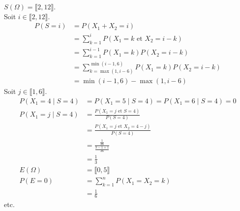 \documentclass[../main.tex]{subfiles}
\begin{document}
\noindent $S(\Omega) = \llbracket 2, 12 \rrbracket$. \\
Soit $i\in \llbracket 2, 12 \rrbracket$. 
\begin{align*}
    P(S = i) &= P(X_1 + X_2 = i) \\
    &= \sum_{k=1}^{i} P(X_1 = k \text{ et } X_2 = i - k) \\
    &= \sum_{k=1}^{i-1} P(X_1 = k) P(X_2 = i - k) \\
    &= \sum_{k=\max(1, i-6)}^{\min(i-1, 6)} P(X_1 = k) P(X_2 = i - k) \\
    &= \min(i-1, 6) - \max(1, i-6)
\end{align*}
Soit $j\in \llbracket 1, 6 \rrbracket$. 
\begin{align*}
    P(X_1 = 4 \mid S = 4) &= P(X_1 = 5 \mid S = 4) = P(X_1 = 6 \mid S = 4) = 0 \\
    P(X_1 = j \mid S = 4) &= \frac{P(X_1 = j \text{ et } S = 4)}{P(S = 4)} \\
    &= \frac{P(X_1 = j \text{ et } X_2 = 4 - j)}{P(S = 4)} \\
    &= \frac{\frac{1}{36}}{\frac{3-1+1}{36}} \\
    &= \frac{1}{3} \\
    E(\Omega) &= \llbracket 0, 5 \rrbracket \\
    P(E = 0) &= \sum_{k=1}^{n} P(X_1 = X_2 = k) \\
    &= \frac{1}{6}
\end{align*}
etc.
\end{document}
